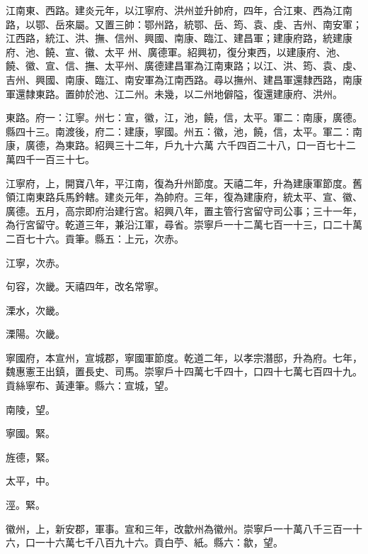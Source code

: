 \begin{pinyinscope}
 江南東、西路。建炎元年，以江寧府、洪州並升帥府，四年，合江東、西為江南路，以鄂、岳來屬。又置三帥：鄂州路，統鄂、岳、筠、袁、虔、吉州、南安軍；江西路，統江、洪、撫、信州、興國、南康、臨江、建昌軍；建康府路，統建康府、池、饒、宣、徽、太平
 州、廣德軍。紹興初，復分東西，以建康府、池、饒、徽、宣、信、撫、太平州、廣德建昌軍為江南東路；以江、洪、筠、袁、虔、吉州、興國、南康、臨江、南安軍為江南西路。尋以撫州、建昌軍還隸西路，南康軍還隸東路。置帥於池、江二州。未幾，以二州地僻隘，復還建康府、洪州。



 東路。府一：江寧。州七：宣，徽，江，池，饒，信，太平。軍二：南康，廣德。縣四十三。南渡後，府二：建康，寧國。州五：徽，池，饒，信，太平。軍二：南康，廣德，為東路。紹興三十二年，戶九十六萬
 六千四百二十八，口一百七十二萬四千一百三十七。



 江寧府，上，開寶八年，平江南，復為升州節度。天禧二年，升為建康軍節度。舊領江南東路兵馬鈐轄。建炎元年，為帥府。三年，復為建康府，統太平、宣、徽、廣德。五月，高宗即府治建行宮。紹興八年，置主管行宮留守司公事；三十一年，為行宮留守。乾道三年，兼沿江軍，尋省。崇寧戶一十二萬七百一十三，口二十萬二百七十六。貢筆。縣五：上元，次赤。



 江寧，次赤。



 句容，次畿。天禧四年，改名常寧。



 溧水，次畿。



 溧陽。次畿。



 寧國府，本宣州，宣城郡，寧國軍節度。乾道二年，以孝宗潛邸，升為府。七年，魏惠憲王出鎮，置長史、司馬。崇寧戶十四萬七千四十，口四十七萬七百四十九。貢絲寧布、黃連筆。縣六：宣城，望。



 南陵，望。



 寧國。緊。



 旌德，緊。



 太平，中。



 涇。緊。



 徽州，上，新安郡，軍事。宣和三年，改歙州為徽州。崇寧戶一十萬八千三百一十六，口一十六萬七千八百九十六。貢白苧、紙。縣六：歙，望。




\end{pinyinscope}
